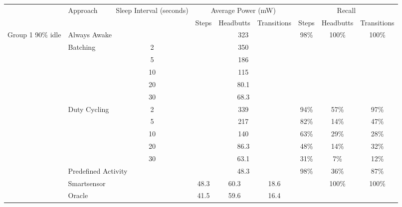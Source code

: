 
\begin{table*}
\centering
{\small
    \begin{tabular}{|l|l|c|c|c|c|c|c|c|}
    \hline
	\multirow{2}{*}{~}			& \multirow{2}{*}{Approach}		& \multirow{2}{*}{\parbox{2.2cm}{Sleep Interval (seconds)}}	
																						& \multicolumn{3}{c|}{Average Power (mW)}		& \multicolumn{3}{c|}{Recall} 													\\ \cline{4-9}
								&								&						& Steps		& Headbutts	& Transitions	& Steps					& Headbutts					& Transitions 				\\ \hline
	\multirow{14}{*}{\parbox{1.2cm}{Group 1 90\% idle}}	& \multicolumn{2}{l|}{Always Awake}						& \multicolumn{3}{c|}{323}				& \multirow{6}{*}{98\%}	& \multirow{6}{*}{100\%}	& \multirow{6}{*}{100\%}	\\ \cline{2-6}
								& \multirow{5}{*}{Batching}		& 2						& \multicolumn{3}{c|}{350}				&						&							&							\\ \cline{3-6}
								& 								& 5						& \multicolumn{3}{c|}{186}				&						&							&							\\ \cline{3-6}
								& 								& 10					& \multicolumn{3}{c|}{115}				&						&							&							\\ \cline{3-6}
								& 								& 20					& \multicolumn{3}{c|}{80.1}				&						&							&							\\ \cline{3-6}
								& 								& 30					& \multicolumn{3}{c|}{68.3}				&						&							&							\\ \cline{2-9}
								& \multirow{5}{*}{Duty Cycling}	& 2						& \multicolumn{3}{c|}{339}				& 94\%					& 57\%						& 97\%						\\ \cline{3-9}
								& 								& 5						& \multicolumn{3}{c|}{217}				& 82\%					& 14\%						& 47\%						\\ \cline{3-9}
								& 								& 10					& \multicolumn{3}{c|}{140}				& 63\%					& 29\%						& 28\%						\\ \cline{3-9}
								& 								& 20					& \multicolumn{3}{c|}{86.3}				& 48\%					& 14\%						& 32\%						\\ \cline{3-9}
								& 								& 30					& \multicolumn{3}{c|}{63.1}				& 31\%					& 7\%						& 12\%						\\ \cline{2-9}
								& \multicolumn{2}{l|}{Predefined Activity}				& \multicolumn{3}{c|}{48.3}				& \multirow{3}{*}{98\%}	& 36\%						& 87\%						\\ \cline{2-6}\cline{8-9}
								& \multicolumn{2}{l|}{Smartsensor}						& 48.3		& 60.3		& 18.6			& 						& \multirow{2}{*}{100\%}	& \multirow{2}{*}{100\%}	\\ \cline{2-6}
								& \multicolumn{2}{l|}{Oracle}							& 41.5		& 59.6		& 16.4			& 						& 							& 							\\ \hline \hline
								

\end{tabular}}
\end{table*}
